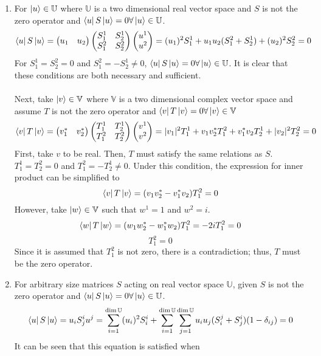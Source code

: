 \begin{sol}
\begin{enumerate}[label=\textbf{(\alph*)}]
\item
For $\ket{u}\in\mathbb U$ where $\mathbb U$ is a two dimensional real vector space and $S$ is not the zero operator and $\bra uS\ket u=0\forall \ket u\in\mathbb U$.
$$\bra uS\ket u=\begin{pmatrix}u_1&u_2\end{pmatrix}\begin{pmatrix}S_1^1&S_2^1\\S_1^2&S_2^2\end{pmatrix}\begin{pmatrix}u^1\\u^2\end{pmatrix}=(u_1)^2S_1^1+u_1u_2(S_1^2+S_2^1)+(u_2)^2S_2^2=0$$  
For $S_1^1=S_2^2=0$ and $S_1^2=-S_2^1\neq 0$, $\bra u S\ket u=0\forall \ket u\in\mathbb U$. It is clear that these conditions are both necessary and sufficient. \\\\
Next, take $\ket v\in\mathbb V$ where $\mathbb V$ is a two dimensional complex vector space and assume $T$ is not the zero operator and $\bra vT\ket v=0\forall\ket v\in \mathbb V$
$$\bra vT\ket v=\begin{pmatrix}v_1^*&v_2^*\end{pmatrix}\begin{pmatrix}T_1^1&T_2^1\\T_1^2&T_2^2\end{pmatrix}\begin{pmatrix}v^1\\v^2\end{pmatrix}=|v_1|^2T_1^1+v_1v_2^*T_1^2+v_1^*v_2T_2^1+|v_2|^2T_2^2=0$$
First, take $v$ to be real. Then, $T$ must satisfy the same relations as $S$.  $T_1^1=T_2^2=0$ and $T_1^2=-T_2^1\neq 0$. Under this condition, the expression for inner product can be simplified to
$$\bra v T\ket v=(v_1v_2^*-v_1^*v_2)T_1^2=0$$However, take $\ket w\in\mathbb V$ such that $w^1=1$ and $w^2=i$.
$$\bra wT\ket w=(w_1w_2^*-w_1^*w_2)T_1^2=-2iT_1^2=0$$
$$T_1^2=0$$ 
Since it is assumed that $T_1^2$ is not zero, there is a contradiction; thus, $T$ must be the zero operator.
\item
For arbitrary size matrices $S$ acting on real vector space $\mathbb U$, given $S$ is not the zero operator and $\bra uS\ket u=0\forall \ket u\in\mathbb U$.
$$\bra uS\ket u=u_i S_j^i u^j=\sum_{i=1}^{\dim\mathbb U}(u_i)^2S_i^i+\sum_{i=1}^{\dim\mathbb U}\sum_{j=1}^{\dim\mathbb U}u_iu_j(S_i^j+S_j^i)(1-\delta_{ij})=0$$ It can be seen that this equation is satisfied when 
\begin{enumerate}


\end{enumerate}
\end{enumerate}
\end{sol}
